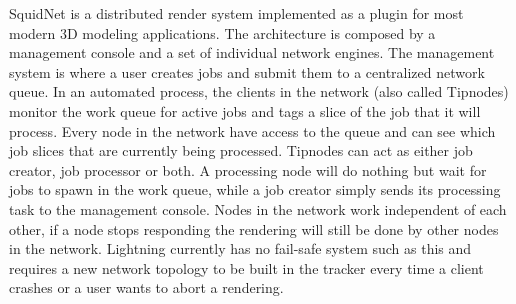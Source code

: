 
SquidNet is a distributed render system implemented as a plugin for most modern 3D modeling applications. The architecture is composed by a management console and a set of individual network engines. The management system is where a user creates jobs and submit them to a centralized network queue. In an automated process, the clients in the network (also called Tipnodes) monitor the work queue for active jobs and tags a slice of the job that it will process. Every node in the network have access to the queue and can see which job slices that are currently being processed. Tipnodes can act as either job creator, job processor or both. A processing node will do nothing but wait for jobs to spawn in the work queue, while a job creator simply sends its processing task to the management console. Nodes in the network work independent of each other, if a node stops responding the rendering will still be done by other nodes in the network. Lightning currently has no fail-safe system such as this and requires a new network topology to be built in the tracker every time a client crashes or a user wants to abort a rendering. 







